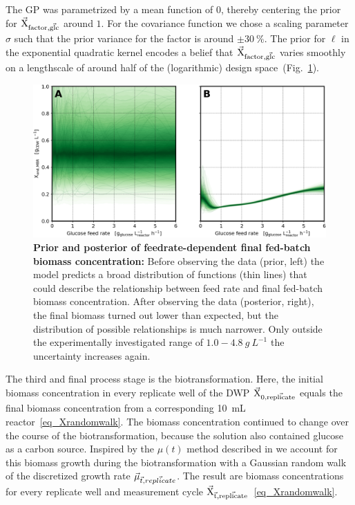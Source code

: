 \documentclass[sn-standardnature]{sn-jnl}%
\def\vec{\mathaccent "017E\relax }
\theoremstyle{thmstyleone}%
\theoremstyle{thmstyletwo}%
\theoremstyle{thmstylethree}%
\begin{document}
The GP was parametrized by a mean function of $0$, thereby centering the prior for $\mathrm{\vec{X}_{factor,\vec{glc}}}$ around $1$.
For the covariance function we chose a scaling parameter $\sigma$ such that the prior variance for the factor is around $\pm30\ \%$.
The prior for $\ell$ in the exponential quadratic kernel encodes a belief that $\mathrm{\vec{X}_{factor,\vec{glc}}}$ varies smoothly on a lengthscale of around half of the (logarithmic) design space~(Fig.~\ref{fig_gpXfactor}).

\begin{figure}[H]
    \centering
    \includegraphics[width=1.0\textwidth]{figures/plot_gp_X_factor.png}
    \caption{
        \textbf{Prior and posterior of feedrate-dependent final fed-batch biomass concentration:}
        Before observing the data (prior, left) the model predicts a broad distribution of functions (thin lines) that could describe the relationship between feed rate and final fed-batch biomass concentration.
        After observing the data (posterior, right), the final biomass turned out lower than expected, but the distribution of possible relationships is much narrower.
        Only outside the experimentally investigated range of $1.0-4.8\ g\ L^{-1}$ the uncertainty increases again.
    }
    \label{fig_gpXfactor}
\end{figure}

The third and final process stage is the biotransformation.
Here, the initial biomass concentration in every replicate well of the DWP $\mathrm{\vec{X}_{0,\vec{replicate}}}$ equals the final biomass concentration from a corresponding 10~mL reactor~\eqref{eq_Xrandomwalk}.
The biomass concentration continued to change over the course of the biotransformation, because the solution also contained glucose as a carbon source.
Inspired by the $\mu(t)$ method described in \cite{bletlPaper} we account for this biomass growth during the biotransformation with a Gaussian random walk of the discretized growth rate $\vec{\mu}_{\vec{t},\vec{replicate}}$.
The result are biomass concentrations for every replicate well and measurement cycle $\mathrm{\vec{X}_{\vec{t},\vec{replicate}}}$~\eqref{eq_Xrandomwalk}.
\end{document}
